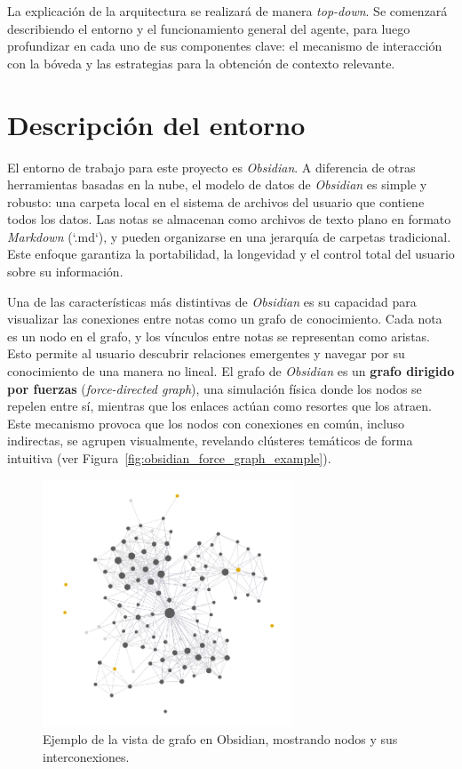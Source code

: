La explicación de la arquitectura se realizará de manera \textit{top-down}. Se comenzará describiendo el entorno y el funcionamiento general del agente, para luego profundizar en cada uno de sus componentes clave: el mecanismo de interacción con la bóveda y las estrategias para la obtención de contexto relevante.

\section{Descripción del entorno}
El entorno de trabajo para este proyecto es \textit{Obsidian}. A diferencia de otras herramientas basadas en la nube, el modelo de datos de \textit{Obsidian} es simple y robusto: una carpeta local en el sistema de archivos del usuario que contiene todos los datos. Las notas se almacenan como archivos de texto plano en formato \textit{Markdown} (`.md`), y pueden organizarse en una jerarquía de carpetas tradicional. Este enfoque garantiza la portabilidad, la longevidad y el control total del usuario sobre su información.

Una de las características más distintivas de \textit{Obsidian} es su capacidad para visualizar las conexiones entre notas como un grafo de conocimiento. Cada nota es un nodo en el grafo, y los vínculos entre notas se representan como aristas. Esto permite al usuario descubrir relaciones emergentes y navegar por su conocimiento de una manera no lineal. El grafo de \textit{Obsidian} es un \textbf{grafo dirigido por fuerzas} (\textit{force-directed graph}), una simulación física donde los nodos se repelen entre sí, mientras que los enlaces actúan como resortes que los atraen. Este mecanismo provoca que los nodos con conexiones en común, incluso indirectas, se agrupen visualmente, revelando clústeres temáticos de forma intuitiva (ver Figura~\ref{fig:obsidian_force_graph_example}).

\begin{figure}[h]
    \centering
    \includegraphics[width=0.66\textwidth]{figures/obsidian_kg_example.png}
    \caption{Ejemplo de la vista de grafo en Obsidian, mostrando nodos y sus interconexiones.}
    \label{fig:obsidian_graph}
\end{figure}

